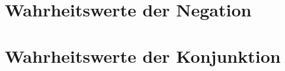 \documentclass[main.tex]{subfiles}
\begin{document}
\begin{tabproofsplit}
  \proofpart{$\vdash$}
    \proofstep{}{\top}{\FormulaRefAuto{\top}}
  \closeproofpart

  \proofpart{$\dashv$}
  \closeproofpart
\end{tabproofsplit}

\begin{tabproof}
  \proofstep{}{\top}{\FormulaRefAuto{\top}}
\end{tabproof}

\section{Wahrheitswerte der Negation}

\FormulaThmAuto{\neg\bot \eqvdash \top}
\begin{tabproofsplit}
  \proofpart{$\vdash$}
  \closeproofpart

  \proofpart{$\dashv$}
  \closeproofpart
\end{tabproofsplit}

\section{Wahrheitswerte der Konjunktion}

\FormulaThmAuto{\top\land \top \eqvdash \top}
\begin{tabproofsplit}
  \proofpart{$\vdash$}
  \closeproofpart

  \proofpart{$\dashv$}
  \closeproofpart
\end{tabproofsplit}

\FormulaThmAuto{\top\land \bot \eqvdash \bot}
\begin{tabproofsplit}
  \proofpart{$\vdash$}
  \closeproofpart

  \proofpart{$\dashv$}
    \proofstep{}{\top}{\FormulaRefAuto{\top}}
  \closeproofpart
\end{tabproofsplit}
\end{document}

